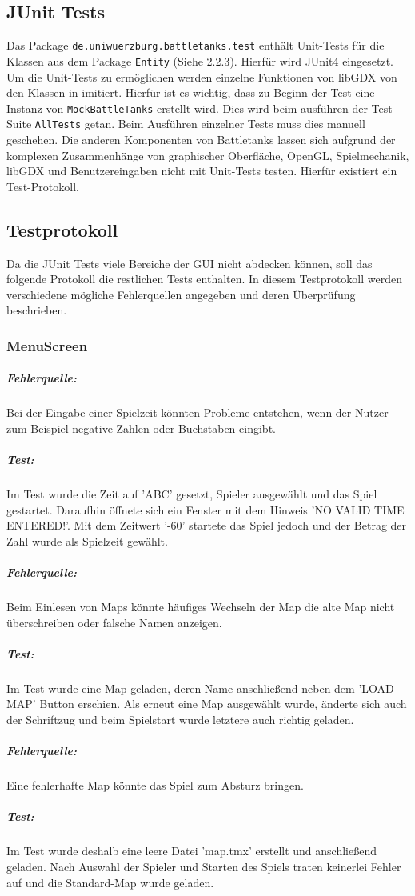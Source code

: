 \documentclass[a4paper]{scrreprt}
\def\code#1{\texttt{#1}}
\begin{document}
\subsection{JUnit Tests}
Das Package  \code{de.uniwuerzburg.battletanks.test} enthält Unit-Tests für die Klassen aus dem Package \code{Entity} (Siehe 2.2.3). Hierfür wird JUnit4 eingesetzt. Um die Unit-Tests zu ermöglichen werden einzelne Funktionen von libGDX von den Klassen in \seqsplit{\code{de.uniwuerzburg.battletanks.test.mock}} imitiert. Hierfür ist es wichtig, dass zu Beginn der Test eine Instanz von \code{MockBattleTanks} erstellt wird. Dies wird beim ausführen der Test-Suite \code{AllTests} getan. Beim Ausführen einzelner Tests muss dies manuell geschehen. Die anderen Komponenten von Battletanks lassen sich aufgrund der komplexen Zusammenhänge von graphischer Oberfläche, OpenGL, Spielmechanik, libGDX und Benutzereingaben nicht mit Unit-Tests testen. Hierfür existiert ein Test-Protokoll. 

\subsection{Testprotokoll}
Da die JUnit Tests viele Bereiche der GUI nicht abdecken können, soll das folgende Protokoll die restlichen Tests enthalten. In diesem Testprotokoll werden verschiedene mögliche Fehlerquellen angegeben und deren Überprüfung beschrieben.

\subsubsection*{MenuScreen}
\subparagraph*{Fehlerquelle:}
Bei der Eingabe einer Spielzeit könnten Probleme entstehen, wenn der Nutzer zum Beispiel negative Zahlen oder Buchstaben eingibt.
\subparagraph*{Test:}
Im Test wurde die Zeit auf 'ABC' gesetzt, Spieler ausgewählt und das Spiel gestartet. Daraufhin öffnete sich ein Fenster mit dem Hinweis 'NO VALID TIME ENTERED!'. Mit dem Zeitwert '-60' startete das Spiel jedoch und der Betrag der Zahl wurde als Spielzeit gewählt.
		
\subparagraph*{Fehlerquelle:}
Beim Einlesen von Maps könnte häufiges Wechseln der Map die alte Map nicht überschreiben oder falsche Namen anzeigen. 
\subparagraph*{Test:}
Im Test wurde eine Map geladen, deren Name anschließend neben dem 'LOAD MAP' Button erschien. Als erneut eine Map ausgewählt wurde, änderte sich auch der Schriftzug und beim Spielstart wurde letztere auch richtig geladen. 

\subparagraph*{Fehlerquelle:}
Eine fehlerhafte Map könnte das Spiel zum Absturz bringen.
\subparagraph*{Test:} 
Im Test wurde deshalb eine leere Datei 'map.tmx' erstellt und anschließend geladen. Nach Auswahl der Spieler und Starten des Spiels traten keinerlei Fehler auf und die Standard-Map wurde geladen.
		
\end{document}
